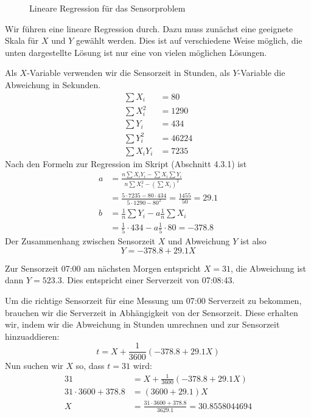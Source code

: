 \begin{figure}
\begin{center}
\end{center}
\caption{Lineare Regression für das Sensorproblem}
\end{figure}
\begin{loesung}
Wir führen eine lineare Regression durch. Dazu muss zunächst eine
geeignete Skala für $X$ und $Y$ gewählt werden. Dies ist auf
verschiedene Weise möglich, die unten dargestellte Lösung ist nur
eine von vielen möglichen Lösungen.

Als $X$-Variable verwenden wir
die Sensorzeit in Stunden, als $Y$-Variable die Abweichung in Sekunden.
\begin{align*}
\sum X_i&=80
\\
\sum X_i^2&=1290
\\
\sum Y_i&=434
\\
\sum Y_i^2&=46224
\\
\sum X_iY_i&=7235
\end{align*}
Nach den Formeln zur Regression  im Skript (Abschnitt 4.3.1) ist
\begin{align*}
a&=\frac{n\sum X_iY_i-\sum X_i\sum Y_i}{n\sum X_i^2-(\sum X_i)^2}
\\
&=\frac{5\cdot 7235-80\cdot 434}{5\cdot 1290-80^2}=\frac{1455}{50}=29.1
\\
b&=\frac1n\sum Y_i -a\frac1n\sum X_i
\\
&=\frac15\cdot 434-a\frac15\cdot 80=-378.8
\end{align*}
Der Zusammenhang zwischen Sensorzeit $X$ und Abweichung $Y$ ist also
\[
Y=-378.8+29.1 X
\]
\begin{teilaufgaben}
\item Zur Sensorzeit 07:00 am nächsten Morgen entspricht $X=31$, die
Abweichung ist dann
$Y=523.3$. Dies entspricht einer Serverzeit von 07:08:43.
\item
Um die richtige Sensorzeit für eine Messung um 07:00 Serverzeit zu bekommen,
brauchen wir die Serverzeit in Abhängigkeit von der Sensorzeit. Diese erhalten
wir, indem wir die Abweichung in Stunden umrechnen und zur Sensorzeit
hinzuaddieren:
\[
t=X+\frac1{3600}(-378.8+29.1X)
\]
Nun suchen wir $X$ so, dass $t=31$ wird:
\begin{align*}
31&=X+\frac1{3600}(-378.8+29.1X)
\\
31\cdot 3600 +378.8&=(3600 + 29.1)X
\\
X&=\frac{31\cdot 3600 + 378.8}{3629.1}=30.8558044694
\end{align*}

\end{teilaufgaben}
\end{loesung}
